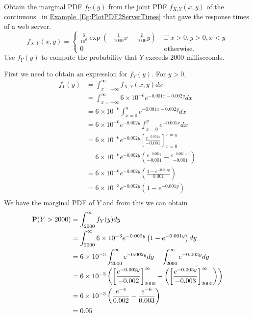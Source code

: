 \begin{example}
Obtain the marginal PDF $f_Y(y)$ from the joint PDF $f_{X,Y}(x,y)$ of the continuous \rv~in \hyperref[Eg:PlotPDF2ServerTimes]{Example~\ref*{Eg:PlotPDF2ServerTimes}} that gave the response times of a web server.
\[
f_{X,Y}(x,y) = 
\begin{cases}
\frac{6}{10^6} \exp \left( -\frac{1}{1000}x-\frac{2}{1000}y \right)
& \text{ if } x>0,y>0,x <y\\
0 & \text{ otherwise}.
\end{cases}
\]
Use $f_Y(y)$ to compute the probability that $Y$ exceeds 2000 milliseconds.

First we need to obtain an expression for $f_Y(y)$. For $y > 0$,
{\scriptsize
\begin{align*}
f_Y(y) 
&= \int_{x=-\infty}^{\infty} f_{X,Y}(x,y) dx\\
&= \int_{x=-\infty}^{\infty} 6 \times 10^{-6} e^{-0.001 x - 0.002y} dx\\
&= 6 \times 10^{-6} \int_{x=0}^{y} e^{-0.001 x - 0.002y} dx\\ 
&= 6 \times 10^{-6} e^{-0.002y} \int_{x=0}^{y}  e^{-0.001 x} dx\\ 
&= 6 \times 10^{-6} e^{-0.002y} \left[ \frac{e^{-0.001 x}}{-0.001}\right]_{x=0}^{x=y}\\ 
&= 6 \times 10^{-6} e^{-0.002y} \left( \frac{e^{-0.001 y}}{-0.001} - \frac{e^{-0.001 \times 0}}{-0.001} \right)\\ 
&= 6 \times 10^{-6} e^{-0.002y} \left( \frac{1- e^{-0.001 y}}{0.001} \right)\\ 
&= 6 \times 10^{-3} e^{-0.002y} \left({1- e^{-0.001 y}} \right)\\ 
\end{align*}
}
We have the marginal PDF of $Y$ and from this we can obtain 
{\scriptsize
\begin{align*}
\mathbf{P}(Y>2000)
&= \int_{2000}^{\infty} f_Y(y) dy \\
&= \int_{2000}^{\infty} 6 \times 10^{-3} e^{-0.002y} \left({1- e^{-0.001 y}} \right) dy\\
&= 6 \times 10^{-3} \int_{2000}^{\infty}  e^{-0.002y} dy - \int_{2000}^{\infty} e^{-0.003 y} dy\\
&= 6 \times 10^{-3} \left( \left[ \frac{e^{-0.002y}}{-0.002} \right]_{2000}^{\infty} 
- \left( \left[ \frac{e^{-0.003y}}{-0.003} \right]_{2000}^{\infty} \right) \right)\\
&= 6 \times 10^{-3} \left( \frac{e^{-4}}{0.002} - \frac{e^{-6}}{0.003} \right)\\
&= 0.05
\end{align*}
}


\end{example}

